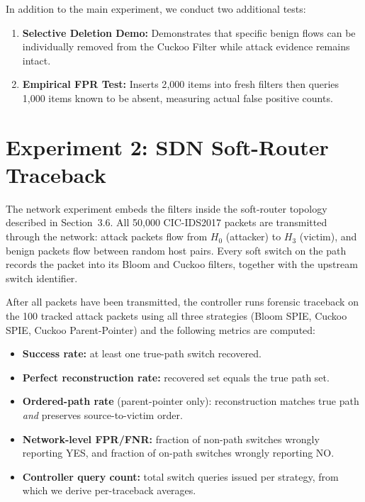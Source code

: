 \documentclass[12pt, a4paper]{report}
\begin{document}
In addition to the main experiment, we conduct two additional tests:

\begin{enumerate}[leftmargin=*]
  \item \textbf{Selective Deletion Demo:} Demonstrates that specific
  benign flows can be individually removed from the Cuckoo Filter while
  attack evidence remains intact.

  \item \textbf{Empirical FPR Test:} Inserts 2{,}000 items into fresh
  filters then queries 1{,}000 items known to be absent, measuring
  actual false positive counts.
\end{enumerate}

\section{Experiment 2: SDN Soft-Router Traceback}

The network experiment embeds the filters inside the soft-router
topology described in Section~3.6. All 50{,}000 CIC-IDS2017 packets are
transmitted through the network: attack packets flow from $H_0$ (attacker)
to $H_3$ (victim), and benign packets flow between random host pairs.
Every soft switch on the path records the packet into its Bloom and
Cuckoo filters, together with the upstream switch identifier.

After all packets have been transmitted, the controller runs forensic
traceback on the 100 tracked attack packets using all three strategies
(Bloom SPIE, Cuckoo SPIE, Cuckoo Parent-Pointer) and the following
metrics are computed:

\begin{itemize}[leftmargin=*]
  \item \textbf{Success rate:} at least one true-path switch recovered.
  \item \textbf{Perfect reconstruction rate:} recovered set equals the
  true path set.
  \item \textbf{Ordered-path rate} (parent-pointer only): reconstruction
  matches true path \textit{and} preserves source-to-victim order.
  \item \textbf{Network-level FPR/FNR:} fraction of non-path switches
  wrongly reporting YES, and fraction of on-path switches wrongly
  reporting NO.
  \item \textbf{Controller query count:} total switch queries issued per
  strategy, from which we derive per-traceback averages.
\end{itemize}
\end{document}
